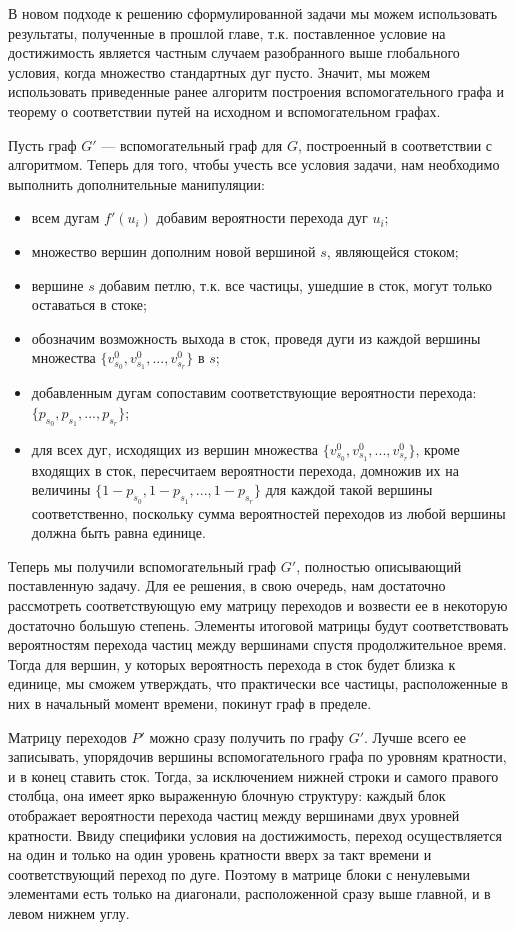 	В новом подходе к решению сформулированной задачи мы можем использовать результаты, полученные в прошлой главе, т.к. поставленное условие на достижимость является частным случаем разобранного выше глобального условия, когда множество стандартных дуг пусто. Значит, мы можем использовать приведенные ранее алгоритм построения вспомогательного графа и теорему о соответствии путей на исходном и вспомогательном графах.  
	
	Пусть граф $G'$ --- вспомогательный граф для $G$, построенный в соответствии с алгоритмом. Теперь для того, чтобы учесть все условия задачи, нам необходимо выполнить дополнительные манипуляции:
	
	\begin{itemize}
		\item всем дугам $f'(u_i)$ добавим вероятности перехода дуг $u_i$;
		\item множество вершин дополним новой вершиной $s$, являющейся стоком;
		\item вершине $s$ добавим петлю, т.к. все частицы, ушедшие в сток, могут только оставаться в стоке;
		\item обозначим возможность выхода в сток, проведя дуги из каждой вершины множества $\{v^0_{s_0}, v^0_{s_1}, ... , v^0_{s_r}\}$ в $s$;
		\item добавленным дугам сопоставим соответствующие вероятности перехода: $\{p_{s_0}, p_{s_1}, ... , p_{s_r}\}$;
		\item для всех дуг, исходящих из вершин множества $\{v^0_{s_0}, v^0_{s_1}, ... , v^0_{s_r}\}$, кроме входящих в сток, пересчитаем вероятности перехода, 
		домножив их на величины $\{ 1 - p_{s_0}, 1 - p_{s_1}, ... , 1 - p_{s_r}\}$ для каждой такой вершины соответственно, поскольку сумма вероятностей переходов из любой вершины должна быть равна единице.
	\end{itemize}	
	
	Теперь мы получили вспомогательный граф $G'$, полностью описывающий поставленную задачу. Для ее решения, в свою очередь, нам достаточно рассмотреть соответствующую ему матрицу переходов и возвести ее в некоторую достаточно большую степень. Элементы итоговой матрицы будут соответствовать вероятностям перехода частиц между вершинами спустя продолжительное время. Тогда для вершин, у которых вероятность перехода в сток будет близка к единице, мы сможем утверждать, что практически все частицы, расположенные в них в начальный момент времени, покинут граф в пределе. 
	
	Матрицу переходов $P'$ можно сразу получить по графу $G'$. Лучше всего ее записывать, упорядочив вершины вспомогательного графа по уровням кратности, и в конец ставить сток. Тогда, за исключением нижней строки и самого правого столбца, она имеет ярко выраженную блочную структуру: каждый блок отображает вероятности перехода частиц между вершинами двух уровней кратности. Ввиду специфики условия на достижимость, переход осуществляется на один и только на один уровень кратности вверх за такт времени и соответствующий переход по дуге. Поэтому в матрице блоки с ненулевыми элементами есть только на диагонали, расположенной сразу выше главной, и в левом нижнем углу. 
	
